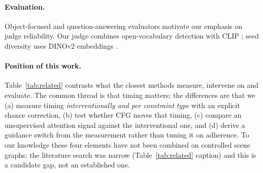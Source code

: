 \paragraph{Evaluation.} Object-focused and question-answering evaluators \citep{ghosh2023geneval,huang2023t2icompbench,hu2023tifa,kamath2025geneval2} motivate our emphasis on judge reliability. Our judge combines open-vocabulary detection \citep{minderer2022owlvit} with CLIP \citep{radford2021clip}; seed diversity uses DINOv2 embeddings \citep{oquab2024dinov2}.

\paragraph{Position of this work.} Table~\ref{tab:related} contrasts what the closest methods measure, intervene on and evaluate. The common thread is that timing matters; the differences are that we (a) measure timing \emph{interventionally and per constraint type} with an explicit chance correction, (b) test whether CFG moves that timing, (c) compare an unsupervised attention signal against the interventional one, and (d) derive a guidance switch from the measurement rather than tuning it on adherence. To our knowledge these four elements have not been combined on controlled scene graphs; the literature search was narrow (Table~\ref{tab:related} caption) and this is a candidate gap, not an established one.

